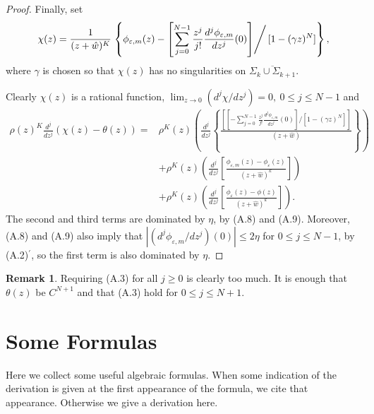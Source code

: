 \documentclass{surv-l}
\theoremstyle{plain}
\theoremstyle{definition}
\newtheorem{remark}[theorem]{Remark}
\numberwithin{equation}{chapter}
\begin{document}
{\begin{proof}
Finally, set
\begin{equation*}
\chi(z)=\frac{1}{(z+\hat{w})^{K}}\left.\left\{\phi_{\varepsilon,m}(z)- \left[\sum_{j=0}^{N-1}\frac{z^{j}}{j!} \frac{d^{j}\phi_{\varepsilon,m}}{dz^{j}}(0)\right]\right/[1-(\gamma z)^{N}]\right\},
\end{equation*}
where $\gamma$ is chosen so that $\chi(z)$ has no singularities on $\overline{\Sigma_{k}\cup\Sigma_{k+1}}$.

Clearly $\chi(z)$ is a rational function, $\lim_{z\rightarrow 0}(d^{j}\chi/dz^{j})=0,\ 0\leq j\leq N-1$ and
\begin{align*}
\rho(z)^{K}\frac{d^{j}}{dz^{j}}(\chi(z)-\theta(z))= & \rho^{K}(z)\left(\frac{d^{j}}{dz^{j}} \left\{\frac{[[-\sum_{j=0}^{N-1}\frac{z^{j}}{j!}\frac{d^{j}\phi_{\varepsilon, m}}{dz^{j}}(0)]/[1-(\gamma z)^{N}]]}{(z+\hat{w})}\right\}\right)\\
& +\rho^{K}(z) \left(\frac{d^{j}}{dz^{j}} \left[\frac{\phi_{\varepsilon,m}(z)-\phi_{\varepsilon}(z)}{(z+\hat{w})^{k}}\right]\right)\\
& +\rho^{K}(z)\left(\frac{d^{j}}{dz^{j}}\left[\frac{\phi_{\varepsilon}(z)-\phi(z)}{(z+\hat{w})^{k}}\right]\right).
\end{align*}
The second and third terms are dominated by $\eta$, by (A.8) and (A.9). Moreover, (A.8) and (A.9) also imply that $|(d^{j}\phi_{\varepsilon,m}/dz^{j})(0)|\leq 2\eta$ for $0\leq j\leq N-1$, by (A.2)$^{\prime}$, so the first term is also dominated by $\eta$.
\end{proof}
\setcounter{theorem}{9}
\begin{remark}\label{remA.10}
Requiring (A.3) for all $j\geq 0$ is clearly too much. It is enough that $\theta(z)$ be $C^{N+1}$ and that (A.3) hold for $0\leq j\leq N+1$.
\end{remark}

\chapter{Some Formulas}\label{appB}

Here we collect some useful algebraic formulas. When some indication of the derivation is given at the first appearance of the formula, we cite that appearance. Otherwise we give a derivation here.

}
\end{document}
